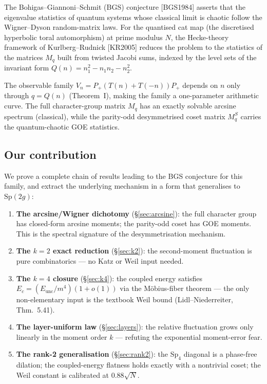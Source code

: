\documentclass[11pt]{article}
\begin{document}
The Bohigas--Giannoni--Schmit (BGS) conjecture [BGS1984] asserts that
the eigenvalue statistics of quantum systems whose classical limit is
chaotic follow the Wigner--Dyson random-matrix laws.  For the
quantised cat map (the discretised hyperbolic toral automorphism) at
prime modulus $N$, the Hecke-theory framework of
Kurlberg--Rudnick [KR2005] reduces the problem to the statistics of
the matrices $M_q$ built from twisted Jacobi sums, indexed by the
level sets of the invariant form
$Q(n) = n_1^2 - n_1 n_2 - n_2^2$.

The observable family $V_n = P_+(T(n) + T(-n))P_+$ depends on $n$
only through $q = Q(n)$ (Theorem~I), making the family a
one-parameter arithmetic curve.  The full character-group matrix $M_q$
has an exactly solvable arcsine spectrum (classical), while the
parity-odd desymmetrised coset matrix $M_q^S$ carries the
quantum-chaotic GOE statistics.

\subsection{Our contribution}

We prove a complete chain of results leading to the BGS conjecture
for this family, and extract the underlying mechanism in a form that
generalises to $\mathrm{Sp}(2g)$:

\begin{enumerate}
\item \textbf{The arcsine/Wigner dichotomy} (\S\ref{sec:arcsine}):
the full character group has closed-form arcsine moments; the
parity-odd coset has GOE moments.  This is the spectral signature of
the desymmetrisation mechanism.
\item \textbf{The $k{=}2$ exact reduction} (\S\ref{sec:k2}): the
second-moment fluctuation is pure combinatorics — no Katz or Weil
input needed.
\item \textbf{The $k{=}4$ closure} (\S\ref{sec:k4}): the coupled
energy satisfies $E_c = (E_{\mathrm{unc}}/m^4)(1 + o(1))$ via the
M\"obius-fiber theorem — the only non-elementary input is the
textbook Weil bound (Lidl--Niederreiter, Thm.~5.41).
\item \textbf{The layer-uniform law} (\S\ref{sec:layers}): the
relative fluctuation grows only linearly in the moment order $k$ —
refuting the exponential moment-error fear.
\item \textbf{The rank-2 generalisation} (\S\ref{sec:rank2}): the
$\mathrm{Sp}_4$ diagonal is a phase-free dilation; the coupled-energy
flatness holds exactly with a nontrivial coset; the Weil constant is
calibrated at $0.88\sqrt{N}$.
\end{enumerate}
\end{document}
